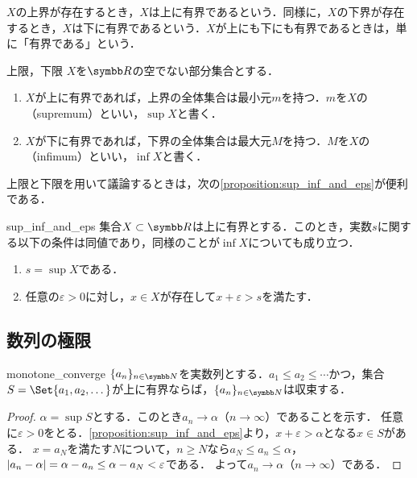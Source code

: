 \documentclass[../../main]{subfiles}
\begin{document}
\(X\)の上界が存在するとき，\(X\)は上に有界であるという．同様に，\(X\)の下界が存在するとき，\(X\)は下に有界であるという．\(X\)が上にも下にも有界であるときは，単に「有界である」という．

\begin{definition}{上限，下限}{}
  \(X\)を\(\numset{R}\)の空でない部分集合とする．
  \begin{enumerate}
    \item \(X\)が上に有界であれば，上界の全体集合は最小元\(m\)を持つ．\(m\)を\(X\)の（supremum）といい，\(\sup X\)と書く．
    \item \(X\)が下に有界であれば，下界の全体集合は最大元\(M\)を持つ．\(M\)を\(X\)の（infimum）といい，\(\inf X\)と書く．
  \end{enumerate}
\end{definition}

上限と下限を用いて議論するときは，次の\cref{proposition:sup_inf_and_eps}が便利である．

\begin{proposition}{}{sup_inf_and_eps}
  集合\(X\subset\numset{R}\)は上に有界とする．このとき，実数\(s\)に関する以下の条件は同値であり，同様のことが\(\inf X\)についても成り立つ．
  \begin{enumerate}
    \item \(s=\sup X\)である．
    \item 任意の\(\varepsilon>0\)に対し，\(x\in X\)が存在して\(x+\varepsilon>s\)を満たす．
  \end{enumerate}
\end{proposition}

\subsection{数列の極限}

\begin{proposition}{}{monotone_converge}
  \(\seq{a_n}_{n\in\numset{N}}\)を実数列とする．\(a_1\leq a_2\leq\dotsb\)かつ，集合\(S=\Set{a_1,a_2,\dotsc}\)が上に有界ならば，\(\seq{a_n}_{n\in\numset{N}}\)は収束する．
\end{proposition}

\begin{proof}
  \(\alpha=\sup S\)とする．このとき\(a_n\to\alpha\)（\(n\to\infty\)）であることを示す．
  任意に\(\varepsilon>0\)をとる．\cref{proposition:sup_inf_and_eps}より，\(x+\varepsilon>\alpha\)となる\(x\in S\)がある．
  \(x=a_N\)を満たす\(N\)について，\(n\geq N\)なら\(a_N\leq a_n\leq\alpha\)，\(\lvert a_n-\alpha\rvert=\alpha-a_n\leq\alpha-a_N<\varepsilon\)である．
  よって\(a_n\to\alpha\)（\(n\to\infty\)）である．
\end{proof}
\end{document}
